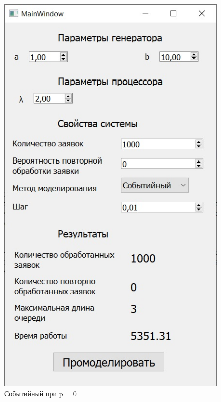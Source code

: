 \documentclass[14pt, a4paper]{extarticle}
\begin{document}
\begin{figure}[h!]
	\centering
	\includegraphics[scale=0.6]{source/event0.jpg}
	\caption{Событийный при p = 0}
\end{figure}
\newpage
\end{document}
